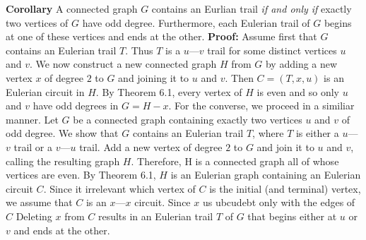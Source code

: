 \vskip 10pt
{\bf Corollary}
\vskip 6pt
A connected graph $G$ contains an Eurlian trail {\it if and only if} exactly two vertices of $G$ have odd degree. Furthermore, each Eulerian trail of $G$ begins at one of these vertices and ends at the other.
\vskip 10pt
{\bf Proof:}
\vskip 6pt
Assume first that $G$ contains an Eulerian trail $T$. Thus $T$ is a $u$---$v$ trail for some distinct vertices $u$ and $v$. We now construct a new connected graph $H$ from $G$ by adding a new vertex $x$ of degree
$2$ to $G$ and joining it to $u$ and $v$. Then $C=(T,x,u)$ is an Eulerian circuit in $H$. By Theorem 6.1, every vertex of $H$ is even and so only $u$ and $v$ have odd degrees in $G=H-x$.
\vskip 1mm
For the converse, we proceed in a similiar manner. Let $G$ be a connected graph containing exactly two vertices $u$ and $v$ of odd degree. We show that $G$ contains an Eulerian trail $T$, where $T$ is either a
$u$---$v$ trail or a $v$---$u$ trail. Add a new vertex of degree $2$ to $G$ and join it to $u$ and $v$, calling the resulting graph $H$. Therefore, H is a connected graph all of whose vertices are even. By
Theorem 6.1, $H$ is an Eulerian graph containing an Eulerian circuit $C$. Since it irrelevant which vertex of $C$ is the initial (and terminal) vertex, we assume that $C$ is an $x$---$x$ circuit. Since $x$
us ubcudebt only with the edges of $C$ Deleting $x$ from $C$ results in an Eulerian trail $T$ of $G$ that begins either at $u$ or $v$ and ends at the other.

\vfill\eject
